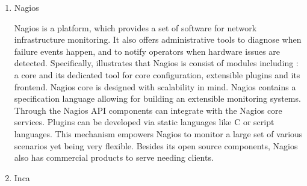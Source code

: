 \begin{enumerate}
\item {} 
Nagios \label{\detokenize{i524/technologies:id664}}{\hyperref[\detokenize{i524/technologies:www-nagios}]{\sphinxcrossref{{[}577{]}}}}

Nagios is a platform, which provides a set of software for
network infrastructure monitoring. It also offers administrative
tools to diagnose when failure events happen, and to notify
operators when hardware issues are detected. Specifically,
illustrates that Nagios is consist of modules including
\label{\detokenize{i524/technologies:id665}}{\hyperref[\detokenize{i524/technologies:nagios-book}]{\sphinxcrossref{{[}578{]}}}}: a core and its dedicated tool for core
configuration, extensible plugins and its frontend. Nagios core
is designed with scalability in mind.  Nagios contains a
specification language allowing for building an extensible
monitoring systems.  Through the Nagios API components can
integrate with the Nagios core services. Plugins can be developed
via static languages like C or script languages. This mechanism
empowers Nagios to monitor a large set of various scenarios yet
being very flexible. \label{\detokenize{i524/technologies:id666}}{\hyperref[\detokenize{i524/technologies:nagios-paper-2012}]{\sphinxcrossref{{[}579{]}}}} Besides its open
source components, Nagios also has commercial products to serve
needing clients.

\item {} 
Inca


\end{enumerate}
